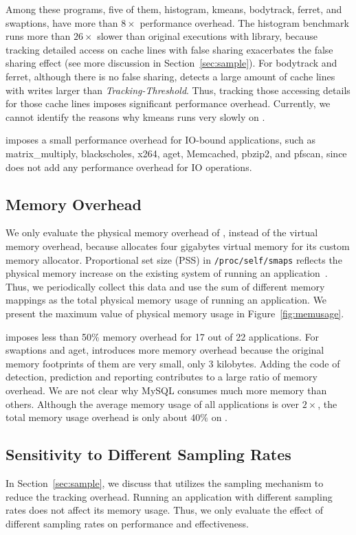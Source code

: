 Among these programs, five of them, histogram, kmeans, bodytrack, ferret, and swaptions, have more than $8\times$ performance overhead. The histogram benchmark runs more than $26\times$ slower than original executions with \pthreads{} library, because tracking detailed access on cache lines with false sharing exacerbates the false sharing effect (see more discussion in Section~\ref{sec:sample}).  For bodytrack and ferret, although there is no false sharing, \Predator{} detects a large amount of cache lines with writes larger than {\it Tracking-Threshold}. Thus, tracking those accessing details for those cache lines imposes significant performance overhead. Currently, we cannot identify the reasons why kmeans runs very slowly on \Predator{}.
   
\Predator{} imposes a small performance overhead for IO-bound applications, such as matrix\_multiply, blackscholes, x264, aget, Memcached, pbzip2, and pfscan, since \Predator{} does not add any performance overhead for IO operations.  

\subsection{Memory Overhead}
\label{sec:memoverhead}
We only evaluate the physical memory overhead of \Predator{}, instead of the virtual memory overhead, because \Predator{} allocates four gigabytes virtual memory for its custom memory allocator. Proportional set size (PSS) in \texttt{/proc/self/smaps} reflects the physical memory increase on the existing system of running an application~\cite{memusage}. Thus, we periodically collect this data and use the sum of different memory mappings as the total physical memory usage of running an application. We present the maximum value of physical memory usage in Figure~\ref{fig:memusage}. 

\Predator{} imposes less than 50\% memory overhead for 17 out of 22 applications.  For swaptions and aget, \Predator{} introduces more memory overhead because the original memory footprints of them are very small, only $3$ kilobytes. Adding the code of detection, prediction and reporting contributes to a large ratio of memory overhead. We are not clear why MySQL consumes much more memory than others. Although the average memory usage of all applications is over $2\times$, the total memory usage overhead is only about $40\%$ on \Predator{}. 


\subsection{Sensitivity to Different Sampling Rates}
\label{sec:sensitivity}
In Section~\ref{sec:sample}, we discuss that \Predator{} utilizes the sampling mechanism to reduce the tracking overhead. Running an application with different sampling rates does not affect its memory usage. Thus, we only evaluate the effect of different sampling rates on performance and effectiveness. 

